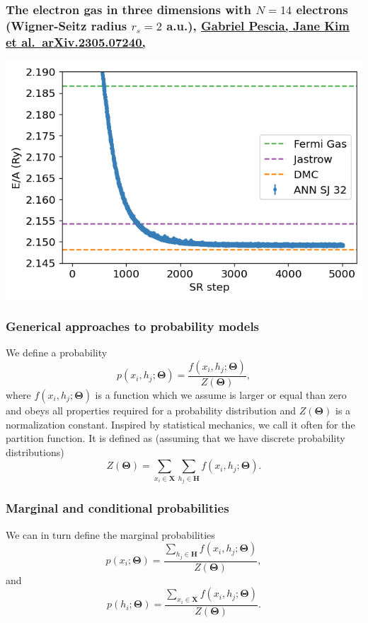 \documentclass[11pt]{beamer} %
\begin{document}
\begin{frame}
\frametitle{The electron gas in three dimensions with $N=14$ electrons (Wigner-Seitz radius $r_s=2$ a.u.), \href{{https://doi.org/10.48550/arXiv.2305.07240}}{Gabriel Pescia, Jane Kim et al.~arXiv.2305.07240,}}


\vspace{6mm}

\centerline{\includegraphics[width=0.8\linewidth]{figures/elgasnew.png}}

\vspace{6mm}

\end{frame}

\begin{frame}
\frametitle{Generical approaches to probability models}

We define a probability
\[
p(x_i,h_j;\mathbf{\Theta}) = \frac{f(x_i,h_j;\mathbf{\Theta})}{Z(\mathbf{\Theta})},
\]
where $f(x_i,h_j;\mathbf{\Theta})$ is a function which we assume is larger or
equal than zero and obeys all properties required for a probability
distribution and $Z(\mathbf{\Theta})$ is a normalization constant. Inspired by
statistical mechanics, we call it often for the partition function.
It is defined as (assuming that we have discrete probability distributions)
\[
Z(\mathbf{\Theta})=\sum_{x_i\in \mathbf{X}}\sum_{h_j\in \mathbf{H}} f(x_i,h_j;\mathbf{\Theta}).
\]
\end{frame}

\begin{frame}
\frametitle{Marginal and conditional probabilities}

We can in turn define the marginal probabilities
\[
p(x_i;\mathbf{\Theta}) = \frac{\sum_{h_j\in \mathbf{H}}f(x_i,h_j;\mathbf{\Theta})}{Z(\mathbf{\Theta})},
\]
and 
\[
p(h_i;\mathbf{\Theta}) = \frac{\sum_{x_i\in \mathbf{X}}f(x_i,h_j;\mathbf{\Theta})}{Z(\mathbf{\Theta})}.
\]
\end{frame}
\end{document}
